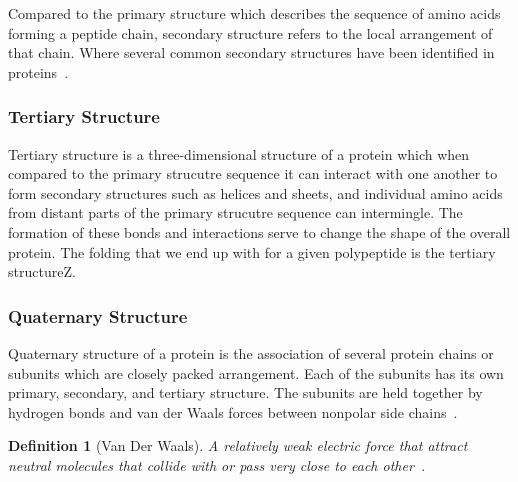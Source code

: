 \documentclass{report}
\newtheorem{definition}{Definition}[section]
\begin{document}
Compared to the primary structure which describes the sequence of amino acids forming a peptide chain, secondary structure refers to the local arrangement of that chain. Where several common secondary structures have been identified in proteins~\cite{noauthor_levels_nodate}.

\subsubsection{Tertiary Structure}

Tertiary structure is a three-dimensional structure of a protein which when compared to the primary strucutre sequence it can interact with one another to form secondary structures such as helices and sheets, and individual amino acids from distant parts of the primary strucutre sequence can intermingle. The formation of these bonds and interactions serve to change the shape of the overall protein. The folding that we end up with for a given polypeptide is the tertiary structureZ\cite{godbey_chapter_2022}.

\subsubsection{Quaternary Structure}

Quaternary structure of a protein is the association of several protein chains or subunits which are closely packed arrangement. Each of the subunits has its own primary, secondary, and tertiary structure. The subunits are held together by hydrogen bonds and van der Waals forces between nonpolar side chains~\cite{ouellette_14_2015}.

\begin{definition}[Van Der Waals]
    A relatively weak electric force that attract neutral molecules that collide with or pass very close to each other~\cite{noauthor_210_2018}.
\end{definition}

\begin{center}
    \begin{tabular}{l|c|r}

    \end{tabular}
\end{center}
\end{document}
